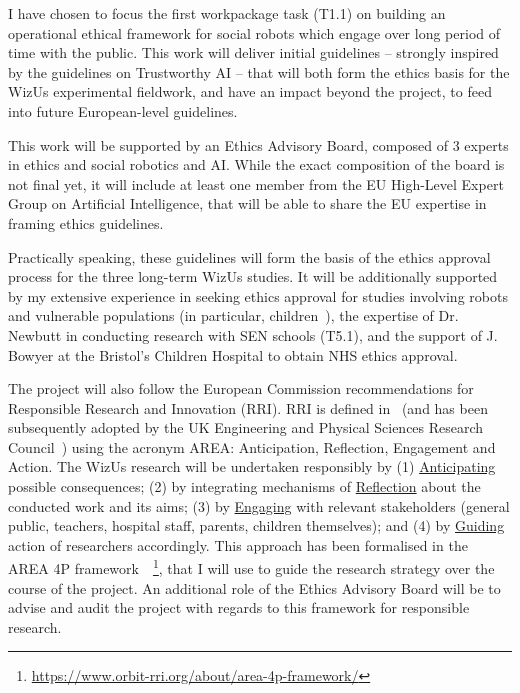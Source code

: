 \documentclass[11pt,a4paper]{report}
\newcommand{\project}{WizUs\xspace}
\begin{document}
I have chosen to focus the first workpackage task (T1.1) on building an
operational ethical framework for social robots which engage over long period of
time with the public. This work will deliver initial guidelines -- strongly
inspired by the guidelines on Trustworthy AI -- that will both form the ethics
basis for the \project experimental fieldwork, and have an impact beyond the
project, to feed into future European-level guidelines.

This work will be supported by an Ethics Advisory Board, composed of 3 experts
in ethics and social robotics and AI. While the exact composition of the board
is not final yet, it will include at least one member from the EU High-Level
Expert Group on Artificial Intelligence, that will be able to share the EU
expertise in framing ethics guidelines.

Practically speaking, these guidelines will form the basis of the ethics
approval process for the three long-term \project studies. It will be
additionally supported by my extensive experience in seeking ethics approval for
studies involving robots and vulnerable populations (in particular,
children~\cite{lemaignan2016learning,lemaignan2018pinsoro,senft2019teaching}),
the expertise of Dr. Newbutt in conducting research with SEN schools (T5.1), and
the support of J. Bowyer at the Bristol's Children Hospital to obtain NHS ethics
approval.


The project will also follow the European Commission recommendations for
Responsible Research and Innovation (RRI). RRI is defined
in~\cite{stilgoe2013developing} (and has been subsequently adopted by the UK Engineering
and Physical Sciences Research Council~\cite{owen2014uk}) using the acronym
AREA: Anticipation, Reflection, Engagement and Action. The \project research
will be undertaken responsibly by (1) \ul{Anticipating} possible consequences;
(2) by integrating mechanisms of \ul{Reflection} about the conducted work and its
aims; (3) by \ul{Engaging} with relevant stakeholders (general public, teachers,
hospital staff, parents, children themselves); and (4) by \ul{Guiding} action of
researchers accordingly. This approach has been formalised in the AREA 4P
framework~\cite{stahl2018implementing}~\footnote{\url{https://www.orbit-rri.org/about/area-4p-framework/}},
that I will use to guide the research strategy over the course of the project.
An additional role of the Ethics Advisory Board will be to advise and audit the
project with regards to this framework for responsible research.
\end{document}
